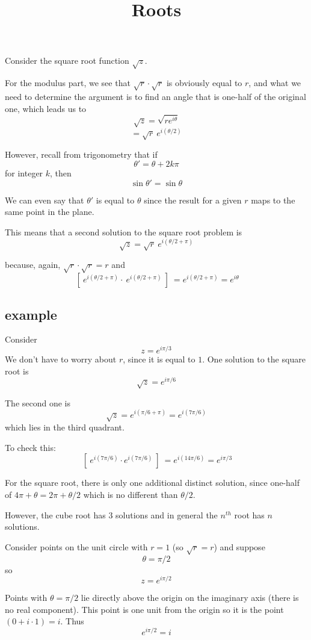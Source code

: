 \documentclass[11pt, oneside]{article}
\title{Roots}
\date{}
\begin{document}
\maketitle
\Large


Consider the square root function $\sqrt{z}$.  

For the modulus part, we see that $\sqrt{r} \cdot \sqrt{r}$ is obviously equal to $r$, and what we need to determine the argument is to find an angle that is one-half of the original one, which leads us to
\[ \sqrt{z} = \sqrt{re^{i\theta}} \]
\[ = \sqrt{r} \ e^{i (\theta/2)} \]

However, recall from trigonometry that if
\[ \theta' = \theta + 2k \pi \]
for integer $k$, then
\[ \sin \theta' = \sin \theta \]

We can even say that $\theta'$ is equal to $\theta$ since the result for a given $r$ maps to the same point in the plane.

This means that a second solution to the square root problem is
\[ \sqrt{z} = \sqrt{r} \ e^{i (\theta/2 + \pi)} \]

because, again, $\sqrt{r} \cdot \sqrt{r} = r$ and
\[ \ [ \ e^{i (\theta/2 + \pi)} \cdot \ e^{i (\theta/2 + \pi)} \ ] \  = e^{i (\theta/2 + \pi)} = e^{i\theta} \]

\subsection*{example}
Consider 
\[ z = e^{i \pi/3} \]
We don't have to worry about $r$, since it is equal to $1$.  One solution to the square root is
\[ \sqrt{z} = e^{i \pi/6} \]

The second one is
\[ \sqrt{z} = e^{i (\pi/6 + \pi)} = e^{i (7\pi/6 )} \]
which lies in the third quadrant.

To check this:
\[ \ [ \  e^{i (7\pi/6 )} \cdot  e^{i (7\pi/6 )} \ ] \ =  e^{i (14\pi/6 )} =  e^{i \pi/3 } \]

For the square root, there is only one additional distinct solution, since one-half of $4 \pi + \theta = 2 \pi + \theta/2$ which is no different than $\theta/2$.

However, the cube root has 3 solutions and in general the $n^{th}$ root has $n$ solutions.

Consider points on the unit circle with $r=1$ (so $\sqrt{r} = r$) and suppose
\[ \theta = \pi/2 \]
so
\[ z = e^{i \pi/2} \]

Points with $\theta = \pi/2$ lie directly above the origin on the imaginary axis (there is no real component).  This point is one unit from the origin so it is the point $(0 + i \cdot 1) = i$.  Thus
\[ e^{i \pi/2} = i \]
\end{document}
